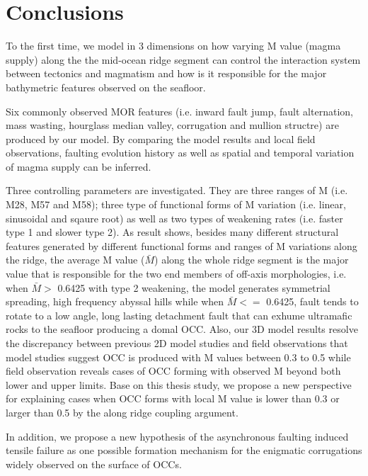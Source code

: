 \pagebreak
\section{Conclusions}
To the first time, we model in 3 dimensions on how varying M value (magma supply) along the the mid-ocean ridge segment can control the interaction system between tectonics and magmatism and how is it responsible for the major bathymetric features observed on the seafloor.

Six commonly observed MOR features (i.e. inward fault jump, fault alternation, mass wasting, hourglass median valley, corrugation and mullion structre) are produced by our model. By comparing the model results and local field observations, faulting evolution history as well as spatial and temporal variation of magma supply can be inferred.

Three controlling parameters are investigated. They are three ranges of M (i.e. M28, M57 and M58); three type of functional forms of M variation (i.e. linear, sinusoidal and sqaure root) as well as two types of weakening rates (i.e. faster type 1 and slower type 2). As result shows, besides many different structural features generated by different functional forms and ranges of M variations along the ridge, the average M value ($\bar{M}$) along the whole ridge segment is the major value that is responsible for the two end members of off-axis morphologies, i.e. when $\bar{M} >$ 0.6425 with type 2 weakening, the model generates symmetrial spreading, high frequency abyssal hills while when $\bar{M} <=$ 0.6425, fault tends to rotate to a low angle, long lasting detachment fault that can exhume ultramafic rocks to the seafloor producing a domal OCC. Also, our 3D model results resolve the discrepancy between previous 2D model studies and field observations that model studies suggest OCC is produced with M values between 0.3 to 0.5 while field observation reveals cases of OCC forming with observed M beyond both lower and upper limits. Base on this thesis study, we propose a new perspective for explaining cases when OCC forms with local M value is lower than 0.3 or larger than 0.5 by the along ridge coupling argument.

In addition, we propose a new hypothesis of the asynchronous faulting induced tensile failure as one possible formation mechanism for the enigmatic corrugations widely observed on the surface of OCCs.




